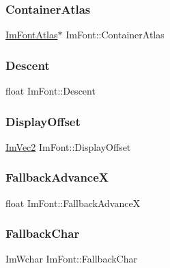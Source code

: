 \hypertarget{struct_im_font_a8a5e0df6be5e3cabe91ae830524db960}{}\label{struct_im_font_a8a5e0df6be5e3cabe91ae830524db960} 
\subsubsection{\texorpdfstring{Container\+Atlas}{ContainerAtlas}}
{\footnotesize\ttfamily \hyperlink{struct_im_font_atlas}{Im\+Font\+Atlas}$\ast$ Im\+Font\+::\+Container\+Atlas}

\hypertarget{struct_im_font_abcca12aa908bf7105433e7db6088a5e5}{}\label{struct_im_font_abcca12aa908bf7105433e7db6088a5e5} 
\subsubsection{\texorpdfstring{Descent}{Descent}}
{\footnotesize\ttfamily float Im\+Font\+::\+Descent}

\hypertarget{struct_im_font_af9b95f3df0b6d45f45903d82301d7f84}{}\label{struct_im_font_af9b95f3df0b6d45f45903d82301d7f84} 
\subsubsection{\texorpdfstring{Display\+Offset}{DisplayOffset}}
{\footnotesize\ttfamily \hyperlink{struct_im_vec2}{Im\+Vec2} Im\+Font\+::\+Display\+Offset}

\hypertarget{struct_im_font_ad58a5ee4492a3a9fa56f73e5a40d728d}{}\label{struct_im_font_ad58a5ee4492a3a9fa56f73e5a40d728d} 
\subsubsection{\texorpdfstring{Fallback\+AdvanceX}{FallbackAdvanceX}}
{\footnotesize\ttfamily float Im\+Font\+::\+Fallback\+AdvanceX}

\hypertarget{struct_im_font_ae54c2c4184bfcbc7b8f6da9cbc4f93c0}{}\label{struct_im_font_ae54c2c4184bfcbc7b8f6da9cbc4f93c0} 
\subsubsection{\texorpdfstring{Fallback\+Char}{FallbackChar}}
{\footnotesize\ttfamily Im\+Wchar Im\+Font\+::\+Fallback\+Char}

